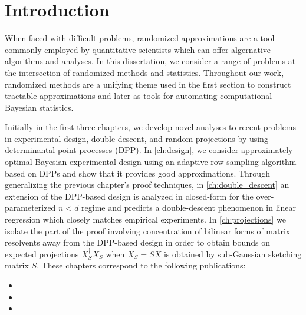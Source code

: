 \documentclass[thesis.tex]{subfiles}
\begin{document}
\chapter{Introduction}
\label{ch:intro}

When faced with difficult problems, randomized approximations are a tool
commonly employed by quantitative scientists which can offer algernative
algorithms and analyses. In this dissertation, we consider a range of problems
at the intersection of randomized methods and statistics.
Throughout our work, randomized methods are a unifying theme used in the first section to
construct tractable approximations and later as tools for automating computational Bayesian statistics.

Initially in the first three chapters, we develop novel analyses to recent problems
in experimental design, double descent, and random projections by using determinantal
point processes (DPP).
In \cref{ch:design}, we consider approximately optimal Bayesian experimental design
using an adaptive row sampling algorithm based on DPPs and show that it provides
good approximations. Through generalizing the previous chapter's proof techniques,
in \cref{ch:double_descent} an extension of the DPP-based design is analyzed in
closed-form for the over-parameterized $n < d$ regime and predicts a double-descent phenomenon in
linear regression which closely matches empirical experiments.
In \cref{ch:projections} we isolate the part of the proof involving concentration
of bilinear forms of matrix resolvents away from the DPP-based design in order to obtain bounds on
expected projections $X_S^\dag X_S$ when $X_S = S X$ is obtained by sub-Gaussian sketching matrix $S$.
These chapters correspond to the following publications:
\begin{itemize}
    \item {}
    \item {}
    \item {}
\end{itemize}
\end{document}
